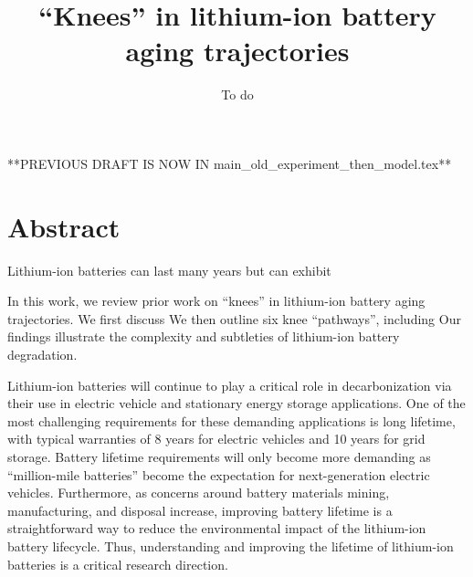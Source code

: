 \documentclass[journal=jpcl, manuscript=article, layout=onecolumn]{achemso}
\title{``Knees'' in lithium-ion battery aging trajectories}
\author{To do}
\date{}
\newcommand{\pbox}[1]{{
\fbox{
\parbox{0.8\textwidth}{  \fbox{$\triangleright$\textcolor{blue}{\textbf{From Peter}:}} 
#1
}}}}
\begin{document}
\maketitle

**PREVIOUS DRAFT IS NOW IN main\_old\_experiment\_then\_model.tex**

\section{Abstract}

\pbox{To do}

Lithium-ion batteries can last many years but can exhibit 

In this work, we review prior work on ``knees'' in lithium-ion battery aging trajectories.
We first discuss
We then outline six knee ``pathways'', including 
Our findings illustrate the complexity and subtleties of lithium-ion battery degradation.

\newpage

Lithium-ion batteries will continue to play a critical role in decarbonization via their use in electric vehicle and stationary energy storage applications. One of the most challenging requirements for these demanding applications is long lifetime, with typical warranties of 8 years for electric vehicles and 10 years for grid storage.\cite{hesse_lithium-ion_2017, bocca_optimal_2020, beltran_lifetime_2020} Battery lifetime requirements will only become more demanding as “million-mile batteries”\cite{harlow_wide_2019} become the expectation for next-generation electric vehicles. Furthermore, as concerns around battery materials mining, manufacturing, and disposal increase, improving battery lifetime is a straightforward way to reduce the environmental impact of the lithium-ion battery lifecycle. Thus, understanding and improving the lifetime of lithium-ion batteries is a critical research direction.
\end{document}
